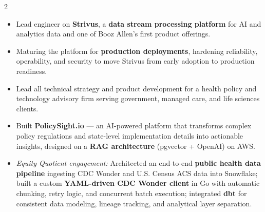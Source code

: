 \documentclass[10pt,a4paper,ragged2e,withhyper]{altacv}
\begin{document}

\makecvheader{}



\begin{paracol}{2}



\begin{itemize}
    \item Lead engineer on \textbf{Strivus}, a \textbf{data stream processing platform} for AI and analytics data and one of Booz Allen's first product offerings.
    \item Maturing the platform for \textbf{production deployments}, hardening reliability, operability, and security to move Strivus from early adoption to production readiness.
\end{itemize}


\divider{}


\begin{itemize}
    \item Lead all technical strategy and product development for a health policy and technology advisory firm serving government, managed care, and life sciences clients.
    \item Built \textbf{PolicySight.io} — an AI-powered platform that transforms complex policy regulations and state-level implementation details into actionable insights, designed on a \textbf{RAG architecture} (pgvector + OpenAI) on AWS.
    \item \textit{Equity Quotient engagement:} Architected an end-to-end \textbf{public health data pipeline} ingesting CDC Wonder and U.S. Census ACS data into Snowflake; built a custom \textbf{YAML-driven CDC Wonder client} in Go with automatic chunking, retry logic, and concurrent batch execution; integrated \textbf{dbt} for consistent data modeling, lineage tracking, and analytical layer separation.
\end{itemize}


\end{paracol}
\end{document}
